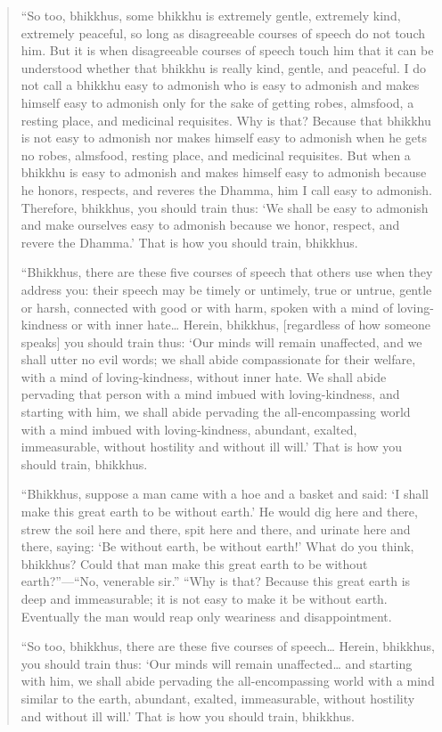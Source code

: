\begin{quotation}
“So too, bhikkhus, some bhikkhu is extremely gentle, extremely kind,
extremely peaceful, so long as disagreeable courses of speech do not
touch him. But it is when disagreeable courses of speech touch him that
it can be understood whether that bhikkhu is really kind, gentle, and
peaceful. I do not call a bhikkhu easy to admonish who is easy to
admonish and makes himself easy to admonish only for the sake of getting
robes, almsfood, a resting place, and medicinal requisites. Why is that?
Because that bhikkhu is not easy to admonish nor makes himself easy to
admonish when he gets no robes, almsfood, resting place, and medicinal
requisites. But when a bhikkhu is easy to admonish and makes himself
easy to admonish because he honors, respects, and reveres the Dhamma,
him I call easy to admonish. Therefore, bhikkhus, you should train thus:
‘We shall be easy to admonish and make ourselves easy to admonish
because we honor, respect, and revere the Dhamma.’ That is how you
should train, bhikkhus.

“Bhikkhus, there are these five courses of speech that others use when
they address you: their speech may be timely or untimely, true or
untrue, gentle or harsh, connected with good or with harm, spoken with a
mind of loving-kindness or with inner hate\ldots{} Herein, bhikkhus,
{[}regardless of how someone speaks{]} you should train thus: ‘Our minds
will remain unaffected, and we shall utter no evil words; we shall abide
compassionate for their welfare, with a mind of loving-kindness, without
inner hate. We shall abide pervading that person with a mind imbued with
loving-kindness, and starting with him, we shall abide pervading the
all-encompassing world with a mind imbued with loving-kindness,
abundant, exalted, immeasurable, without hostility and without ill
will.’ That is how you should train, bhikkhus.

“Bhikkhus, suppose a man came with a hoe and a basket and said: ‘I shall
make this great earth to be without earth.’ He would dig here and there,
strew the soil here and there, spit here and there, and urinate here and
there, saying: ‘Be without earth, be without earth!’ What do you think,
bhikkhus? Could that man make this great earth to be without
earth?”—“No, venerable sir.” “Why is that? Because this great earth is
deep and immeasurable; it is not easy to make it be without earth.
Eventually the man would reap only weariness and disappointment.

“So too, bhikkhus, there are these five courses of speech\ldots{} Herein,
bhikkhus, you should train thus: ‘Our minds will remain unaffected\ldots{}
and starting with him, we shall abide pervading the all-encompassing
world with a mind similar to the earth, abundant, exalted, immeasurable,
without hostility and without ill will.’ That is how you should train,
bhikkhus.


\end{quotation}
